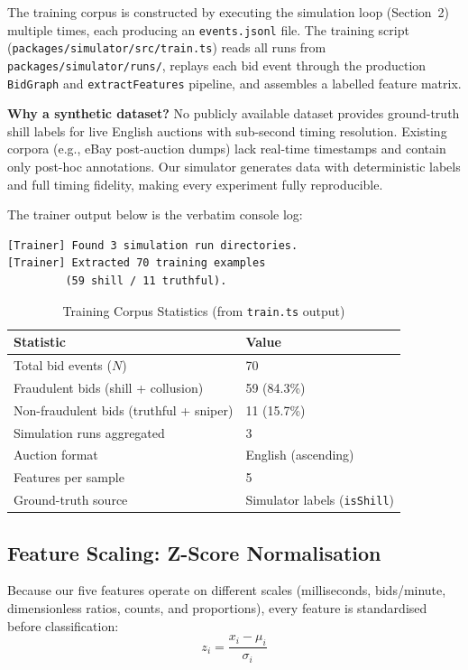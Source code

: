 \documentclass[11pt]{article}
\begin{document}
The training corpus is constructed by executing the simulation loop
(Section~2) multiple times, each producing an \texttt{events.jsonl} file.
The training script (\texttt{packages/simulator/src/train.ts}) reads all
runs from \texttt{packages/simulator/runs/}, replays each bid event through
the production \texttt{BidGraph} and \texttt{extractFeatures} pipeline,
and assembles a labelled feature matrix.

\textbf{Why a synthetic dataset?} No publicly available dataset provides
ground-truth shill labels for live English auctions with sub-second
timing resolution. Existing corpora (e.g., eBay post-auction dumps) lack
real-time timestamps and contain only post-hoc annotations. Our simulator
generates data with deterministic labels and full timing fidelity,
making every experiment fully reproducible.

The trainer output below is the verbatim console log:
\begin{lstlisting}[language={},caption={Actual train.ts output.}]
[Trainer] Found 3 simulation run directories.
[Trainer] Extracted 70 training examples
         (59 shill / 11 truthful).
\end{lstlisting}

\begin{table}[ht]
\centering
\caption{Training Corpus Statistics (from \texttt{train.ts} output)}
\label{tab:corpus}
\begin{tabular}{ll}
\toprule
\textbf{Statistic} & \textbf{Value} \\
\midrule
Total bid events ($N$) & 70 \\
Fraudulent bids (shill + collusion) & 59 (84.3\%) \\
Non-fraudulent bids (truthful + sniper) & 11 (15.7\%) \\
Simulation runs aggregated & 3 \\
Auction format & English (ascending) \\
Features per sample & 5 \\
Ground-truth source & Simulator labels (\texttt{isShill}) \\
\bottomrule
\end{tabular}
\end{table}

\subsection{Feature Scaling: Z-Score Normalisation}

Because our five features operate on different scales (milliseconds,
bids/minute, dimensionless ratios, counts, and proportions), every
feature is standardised before classification:
\begin{equation}
    z_i = \frac{x_i - \mu_i}{\sigma_i}
\end{equation}
\end{document}
